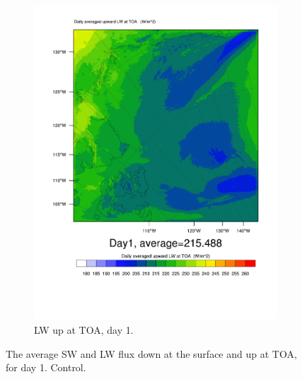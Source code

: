\begin{figure}
\begin{subfigure}{0.48\textwidth}
		\includegraphics[width=\textwidth]{results/control/LWUPT_Day1.pdf}
		\caption{LW up at TOA, day 1.}
		\label{subfig:lwup_r1Day1}
	\end{subfigure}
	\caption{The average SW and LW flux down at the surface and up at TOA, for day 1. Control.}
	\label{fig:radiation_r1Day1}
\end{figure}

